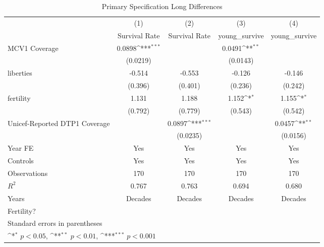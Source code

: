 \begin{table}[htbp]\centering
\def\sym#1{\ifmmode^{#1}\else\(^{#1}\)\fi}
\caption{Primary Specification Long Differences}
\begin{tabular}{l*{4}{c}}
\toprule
                &\multicolumn{1}{c}{(1)}&\multicolumn{1}{c}{(2)}&\multicolumn{1}{c}{(3)}&\multicolumn{1}{c}{(4)}\\
                &\multicolumn{1}{c}{Survival Rate}&\multicolumn{1}{c}{Survival Rate}&\multicolumn{1}{c}{young\_survive}&\multicolumn{1}{c}{young\_survive}\\
\midrule
MCV1 Coverage   &   0.0898\sym{***}&                  &   0.0491\sym{**} &                  \\
                & (0.0219)         &                  & (0.0143)         &                  \\
\addlinespace
liberties       &   -0.514         &   -0.553         &   -0.126         &   -0.146         \\
                &  (0.396)         &  (0.401)         &  (0.236)         &  (0.242)         \\
\addlinespace
fertility       &    1.131         &    1.188         &    1.152\sym{*}  &    1.155\sym{*}  \\
                &  (0.792)         &  (0.779)         &  (0.543)         &  (0.542)         \\
\addlinespace
Unicef-Reported DTP1 Coverage&                  &   0.0897\sym{***}&                  &   0.0457\sym{**} \\
                &                  & (0.0235)         &                  & (0.0156)         \\
\addlinespace
Year FE         &      Yes         &      Yes         &      Yes         &      Yes         \\
\addlinespace
Controls        &      Yes         &      Yes         &      Yes         &      Yes         \\
\midrule
Observations    &      170         &      170         &      170         &      170         \\
\(R^{2}\)       &    0.767         &    0.763         &    0.694         &    0.680         \\
Years           &  Decades         &  Decades         &  Decades         &  Decades         \\
Fertility?      &                  &                  &                  &                  \\
\bottomrule
\multicolumn{5}{l}{\footnotesize Standard errors in parentheses}\\
\multicolumn{5}{l}{\footnotesize \sym{*} \(p<0.05\), \sym{**} \(p<0.01\), \sym{***} \(p<0.001\)}\\
\end{tabular}
\end{table}
